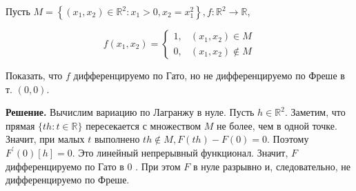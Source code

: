 \begin{task} Пусть $M=\left\{\left(x_{1}, x_{2}\right) \in \mathbb{R}^{2}: x_{1}>0, x_{2}=x_{1}^{2}\right\}, f: \mathbb{R}^{2} \rightarrow \mathbb{R}$,

    $$
    f\left(x_{1}, x_{2}\right)= \begin{cases}1, & \left(x_{1}, x_{2}\right) \in M \\ 0, & \left(x_{1}, x_{2}\right) \notin M\end{cases}
    $$
    
    Показать, что $f$ дифференцируемо по Гато, но не дифференцируемо по Фреше в т. $(0,0)$.
    
    \textbf{Решение.} Вычислим вариацию по Лагранжу в нуле. Пусть $h \in \mathbb{R}^{2}$. Заметим, что прямая $\{t h: t \in \mathbb{R}\}$ пересекается с множеством $M$ не более, чем в одной точке. Значит, при малых $t$ выполнено $t h \notin M, F(t h)-F(0)=0$. Поэтому $F^{\prime}(0)[h]=0$. Это линейный непрерывный функционал. Значит, $F$ дифференцируемо по Гато в 0 . При этом $F$ в нуле разрывно и, следовательно, не дифференцируемо по Фреше.
    \end{task}
    
